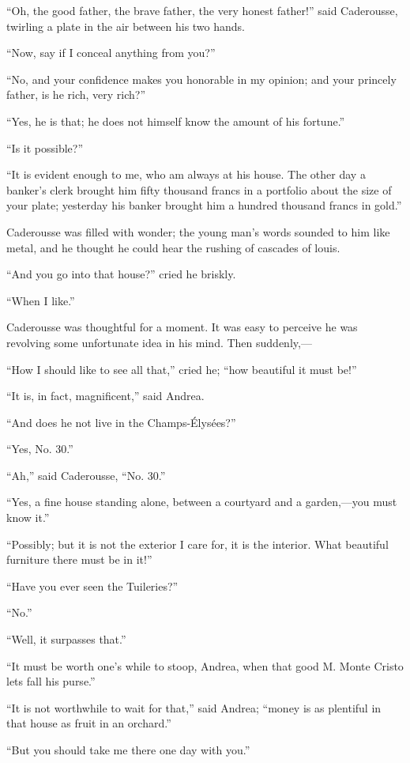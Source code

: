 “Oh, the good father, the brave father, the very honest father!” said
Caderousse, twirling a plate in the air between his two hands.

“Now, say if I conceal anything from you?”

“No, and your confidence makes you honorable in my opinion; and your
princely father, is he rich, very rich?”

“Yes, he is that; he does not himself know the amount of his fortune.”

“Is it possible?”

“It is evident enough to me, who am always at his house. The other day
a banker’s clerk brought him fifty thousand francs in a portfolio about
the size of your plate; yesterday his banker brought him a hundred
thousand francs in gold.”

Caderousse was filled with wonder; the young man’s words sounded to him
like metal, and he thought he could hear the rushing of cascades of
louis.

“And you go into that house?” cried he briskly.

“When I like.”

Caderousse was thoughtful for a moment. It was easy to perceive he was
revolving some unfortunate idea in his mind. Then suddenly,—

“How I should like to see all that,” cried he; “how beautiful it must
be!”

“It is, in fact, magnificent,” said Andrea.

“And does he not live in the Champs-Élysées?”

“Yes, No. 30.”

“Ah,” said Caderousse, “No. 30.”

“Yes, a fine house standing alone, between a courtyard and a
garden,—you must know it.”

“Possibly; but it is not the exterior I care for, it is the interior.
What beautiful furniture there must be in it!”

“Have you ever seen the Tuileries?”

“No.”

“Well, it surpasses that.”

“It must be worth one’s while to stoop, Andrea, when that good M. Monte
Cristo lets fall his purse.”

“It is not worthwhile to wait for that,” said Andrea; “money is as
plentiful in that house as fruit in an orchard.”

“But you should take me there one day with you.”

